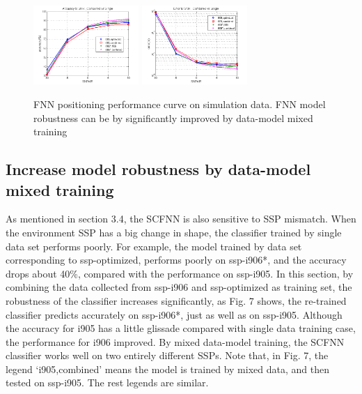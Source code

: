 \begin{figure}
\includegraphics[width=4cm,height=3cm]{figure/Accuracy_to_SNR_Combined_vs_Single}
\includegraphics[width=4cm,height=3cm]{figure/Error_to_SNR_Combined_vs_Single}
\caption{FNN positioning performance curve on simulation data. FNN model robustness can be by significantly improved by data-model mixed training}
\end{figure}

\subsection{%
Increase model robustness by data-model mixed training}
As mentioned in section 3.4, the SCFNN is also sensitive to SSP mismatch. When the environment SSP has a big change in shape, the classifier trained by single data set performs poorly.
For example, the model trained by data set corresponding to ssp-optimized, performs poorly on ssp-i906{*}, and the accuracy drops about 40\%, compared with the performance on ssp-i905. In this section, by combining the data collected from ssp-i906 and ssp-optimized as training set, the robustness of the classifier increases significantly, as Fig. 7 shows, the re-trained classifier predicts accurately on ssp-i906{*}, just as well as on ssp-i905.
Although the accuracy for i905 has a little glissade compared with single data training case, the performance for i906 improved. By mixed data-model training, the SCFNN classifier works well on two entirely different SSPs. Note that, in Fig. 7, the legend `i905,combined'  means the model is trained by mixed data, and then tested on ssp-i905. The rest legends are similar.
